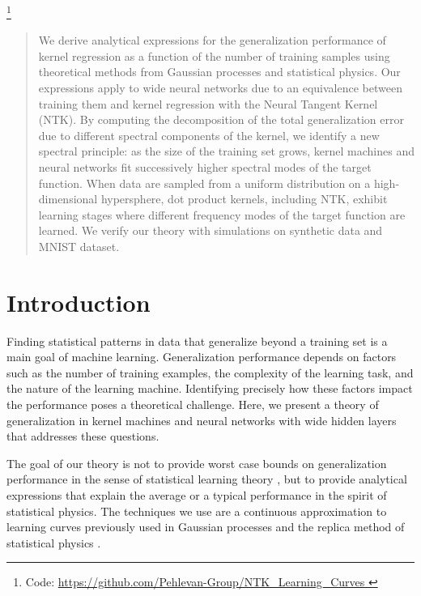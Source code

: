 \documentclass{article}
\begin{document}
{\let\thefootnote\relax\footnote{{Code: \url{ https://github.com/Pehlevan-Group/NTK_Learning_Curves }}}}


\begin{abstract}
We derive analytical expressions for the  generalization performance of kernel regression as a function of the number of training samples using theoretical methods from Gaussian processes and statistical physics. Our expressions apply to  wide neural networks due to an equivalence between training them and kernel regression with the Neural Tangent Kernel (NTK). By computing the decomposition of the total generalization error due to different spectral components of the kernel, we identify a new spectral principle: as the size of the training set grows, kernel machines and neural networks fit successively higher spectral modes of the target function. When data are sampled from a uniform distribution on a high-dimensional hypersphere, dot product kernels, including NTK, exhibit learning stages where different frequency modes of the target function are learned. We verify our theory with simulations on synthetic data and MNIST dataset.
\end{abstract}


\section{Introduction}

Finding statistical patterns in data that generalize beyond a training set is a main goal of machine learning. Generalization performance depends on factors such as the number of training examples, the complexity of the learning task, and the nature of the learning machine. Identifying precisely how these factors impact the performance poses a theoretical challenge. Here, we present a theory of generalization in  kernel machines \cite{scholkopf_smola} and neural networks \cite{lecun2015deep} with wide hidden layers that addresses these questions. 


The goal of our theory is not to provide worst case bounds on generalization performance in the sense of statistical learning theory \cite{vapnik1999overview}, but to provide analytical expressions that explain the average or a typical performance in the spirit of statistical physics. The techniques we use are a continuous approximation to learning curves previously used in Gaussian processes  \cite{sollich1999learning,sollich2001mismatch,sollich2002approx} and the replica method of statistical physics \cite{sherrington_spinglass,mezard1987spin}. 
\end{document}
